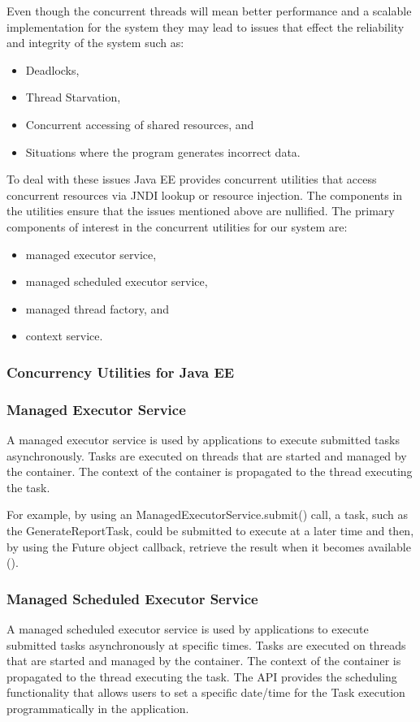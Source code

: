 \documentclass[12pt]{article}
\begin{document}
Even though the concurrent threads will mean better performance and a scalable implementation for the system they may lead to issues that effect the reliability and integrity of the system such as:
\begin{itemize}
\item Deadlocks,
\item Thread Starvation,
\item Concurrent  accessing of shared resources, and
\item Situations where the program generates incorrect data.
\end{itemize}

To deal with these issues Java EE provides concurrent utilities that access concurrent resources via JNDI lookup or resource injection. The components in the utilities ensure that the issues mentioned above are nullified. The primary components of interest in the concurrent utilities for our system are:
\begin{itemize}
\item managed executor service, 
\item managed scheduled executor service, 
\item managed thread factory, and 
\item context service.
\end{itemize}
\subsubsection{Concurrency Utilities for Java EE}
\subsubsection{Managed Executor Service}
A managed executor service is used by applications to execute submitted tasks asynchronously. Tasks are executed on threads that are
started and managed by the container. The context of the container is propagated to the thread executing the task.

For example, by using an ManagedExecutorService.submit() call, a task, such as the GenerateReportTask, could be submitted to execute at a later time and then, by using the Future object callback, retrieve the result when it becomes available ().

\subsubsection{Managed Scheduled Executor Service}
A managed scheduled executor service is used by applications to execute submitted tasks asynchronously at specific times. Tasks are executed on threads that are started and managed by the container. The context of the container is propagated to the thread executing the task. The API
provides the scheduling functionality that allows users to set a specific date/time for the Task execution programmatically in the application.
\end{document}
